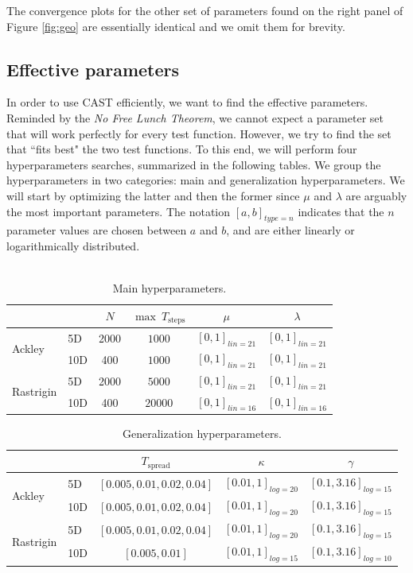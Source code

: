 \documentclass[10pt,a4paper]{article}
\theoremstyle{theorem}
\numberwithin{equation}{section}
\begin{document}
The convergence plots for the other set of parameters found on the right panel of Figure \ref{fig:geo} are essentially identical and we omit them for brevity. 

\subsection{Effective parameters}

In order to use CAST efficiently, we want to find the effective parameters. Reminded by the \textit{No Free Lunch Theorem},\cite{wolpert_no_1997} we cannot expect a parameter set that will work perfectly for every test function. However, we try to find the set that ``fits best" the two test functions. To this end, we will perform four hyperparameters searches, summarized in the following tables. We group the hyperparameters in two categories: main and generalization hyperparameters. We will start by optimizing the latter and then the former since $\mu$ and $\lambda$ are arguably the most important parameters. The notation $[a,b]_{type=n}$ indicates that the $n$ parameter values are chosen between $a$ and $b$, and are either linearly or logarithmically distributed. 
\\\\
\begin{table}[htb]
\centering
\begin{tabular}[t]{l|lcccc}
\hline
\textbf{}&&$N$&$\max \ T_\mathrm{steps}$&$\mu$&$\lambda$\\
\hline
\multirow{2}{*}{Ackley}&5D&2000&$1000$&$[0,1]_{lin=21}$&$[0,1]_{lin=21}$\\
&10D&400&$1000$&$[0,1]_{lin=21}$&$[0,1]_{lin=21}$\\
\hline\hline
\multirow{2}{*}{Rastrigin}&5D&2000&$5000$&$[0,1]_{lin=21}$&$[0,1]_{lin=21}$\\
&10D&400&$20000$&$[0,1]_{lin=16}$&$[0,1]_{lin=16}$\\
\hline
\end{tabular}
\caption{Main hyperparameters.}
\end{table}
\vspace{-1.5em}
\begin{table}[htb]
\centering
\begin{tabular}[t]{l|lccc}
\hline
\textbf{}&&$T_{\mathrm{spread}}$&$\kappa$&$\gamma$\\
\hline
\multirow{2}{*}{Ackley}&5D&$[0.005, 0.01, 0.02, 0.04]$&$[0.01, 1]_{log=20}$&$[0.1, 3.16]_{log=15}$\\
&10D&$[0.005, 0.01, 0.02, 0.04]$&$[0.01, 1]_{log=20}$&$[0.1, 3.16]_{log=15}$\\
\hline\hline
\multirow{2}{*}{Rastrigin}&5D&$[0.005, 0.01, 0.02, 0.04]$&$[0.01, 1]_{log=20}$&$[0.1, 3.16]_{log=15}$\\
&10D&$[0.005, 0.01]$&$[0.01, 1]_{log=15}$&$[0.1, 3.16]_{log=10}$\\
\hline
\end{tabular}
\caption{Generalization hyperparameters.}
\end{table}
\end{document}
